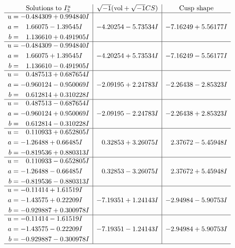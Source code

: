 \documentclass[1p]{elsarticle_modified}
\theoremstyle{definition}
\newcommand{\I}{\sqrt{-1}}
\begin{document}
$$\begin{array}{c|c|c}  
\text{Solutions to }I^u_{3}& \I (\text{vol} + \sqrt{-1}CS) & \text{Cusp shape}\\
 \hline 
\begin{aligned}
u &= -0.484309 + 0.994840 I \\
a &= \phantom{-}1.66075 - 1.39545 I \\
b &= \phantom{-}1.136610 + 0.491905 I\end{aligned}
 & -4.20254 - 5.73534 I & -7.16249 + 5.56177 I \\ \hline\begin{aligned}
u &= -0.484309 - 0.994840 I \\
a &= \phantom{-}1.66075 + 1.39545 I \\
b &= \phantom{-}1.136610 - 0.491905 I\end{aligned}
 & -4.20254 + 5.73534 I & -7.16249 - 5.56177 I \\ \hline\begin{aligned}
u &= \phantom{-}0.487513 + 0.687654 I \\
a &= -0.960124 - 0.950069 I \\
b &= \phantom{-}0.612814 + 0.310228 I\end{aligned}
 & -2.09195 + 2.24783 I & -2.26438 - 2.85323 I \\ \hline\begin{aligned}
u &= \phantom{-}0.487513 - 0.687654 I \\
a &= -0.960124 + 0.950069 I \\
b &= \phantom{-}0.612814 - 0.310228 I\end{aligned}
 & -2.09195 - 2.24783 I & -2.26438 + 2.85323 I \\ \hline\begin{aligned}
u &= \phantom{-}0.110933 + 0.652805 I \\
a &= -1.26488 + 0.66485 I \\
b &= -0.819536 + 0.880313 I\end{aligned}
 & \phantom{-}0.32853 + 3.26075 I & \phantom{-}2.37672 - 5.45948 I \\ \hline\begin{aligned}
u &= \phantom{-}0.110933 - 0.652805 I \\
a &= -1.26488 - 0.66485 I \\
b &= -0.819536 - 0.880313 I\end{aligned}
 & \phantom{-}0.32853 - 3.26075 I & \phantom{-}2.37672 + 5.45948 I \\ \hline\begin{aligned}
u &= -0.11414 + 1.61519 I \\
a &= -1.43575 + 0.22209 I \\
b &= -0.929887 + 0.300978 I\end{aligned}
 & -7.19351 + 1.24143 I & -2.94984 - 5.90753 I \\ \hline\begin{aligned}
u &= -0.11414 - 1.61519 I \\
a &= -1.43575 - 0.22209 I \\
b &= -0.929887 - 0.300978 I\end{aligned}
 & -7.19351 - 1.24143 I & -2.94984 + 5.90753 I\\
 \hline 
 \end{array}$$\newpage
\end{document}
